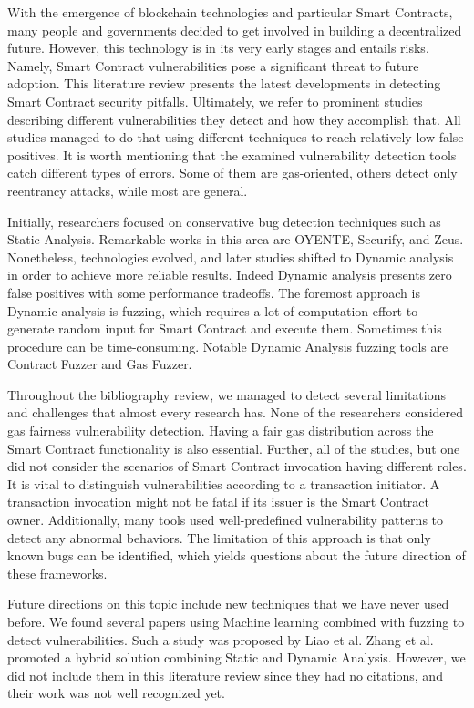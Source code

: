 \documentclass[a4paper,11pt]{article}
\begin{document}
With the emergence of blockchain technologies and particular Smart Contracts,
many people and governments decided to get involved in building a decentralized
future. However, this technology is in its very early stages and entails risks.
Namely, Smart Contract vulnerabilities pose a significant threat to future
adoption. This literature review presents the latest developments in detecting
Smart Contract security pitfalls. Ultimately, we refer to prominent studies
describing different vulnerabilities they detect and how they accomplish that.
All studies managed to do that using different techniques to reach relatively
low false positives. It is worth mentioning that the examined vulnerability
detection tools catch different types of errors. Some of them are gas-oriented,
others detect only reentrancy attacks, while most are general.

Initially, researchers focused on conservative bug detection techniques such as
Static Analysis. Remarkable works in this area are OYENTE, Securify, and Zeus.
Nonetheless, technologies evolved, and later studies shifted to Dynamic analysis
in order to achieve more reliable results. Indeed Dynamic analysis presents zero
false positives with some performance tradeoffs. The foremost approach is
Dynamic analysis is fuzzing, which requires a lot of computation effort to
generate random input for Smart Contract and execute them. Sometimes this
procedure can be time-consuming. Notable Dynamic Analysis fuzzing tools are
Contract Fuzzer and Gas Fuzzer.

Throughout the bibliography review, we managed to detect several limitations and
challenges that almost every research has. None of the researchers considered
gas fairness vulnerability detection. Having a fair gas distribution across the
Smart Contract functionality is also essential. Further, all of the studies, but
one \cite{jiang2018contractfuzzer} did not consider the scenarios of Smart Contract
invocation having different roles. It is vital to distinguish vulnerabilities
according to a transaction initiator. A transaction invocation might not be
fatal if its issuer is the Smart Contract owner. Additionally, many tools used
well-predefined vulnerability patterns to detect any abnormal behaviors. The
limitation of this approach is that only known bugs can be identified, which
yields questions about the future direction of these frameworks.

Future directions on this topic include new techniques that we have never used
before. We found several papers using Machine learning combined with fuzzing to
detect vulnerabilities. Such a study was proposed by Liao et al. Zhang et al.
promoted a hybrid solution combining Static and Dynamic Analysis. However, we
did not include them in this literature review since they had no citations, and
their work was not well recognized yet.
\end{document}
